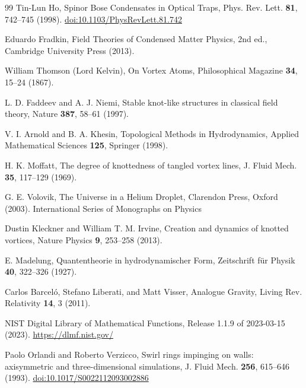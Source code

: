 \documentclass[smallextended]{svjour3}       %
\begin{document}
\begin{thebibliography}{99}
        Tin-Lun Ho,
        Spinor Bose Condensates in Optical Traps,
        Phys. Rev. Lett. \textbf{81}, 742--745 (1998).
        \href{https://doi.org/10.1103/PhysRevLett.81.742}{doi:10.1103/PhysRevLett.81.742}

        Eduardo Fradkin,
        Field Theories of Condensed Matter Physics,
        2nd ed., Cambridge University Press (2013).

        William Thomson (Lord Kelvin),
        On Vortex Atoms,
        Philosophical Magazine \textbf{34}, 15--24 (1867).

        L. D. Faddeev and A. J. Niemi,
        Stable knot-like structures in classical field theory,
        Nature \textbf{387}, 58--61 (1997).

        V. I. Arnold and B. A. Khesin,
        Topological Methods in Hydrodynamics,
        Applied Mathematical Sciences \textbf{125}, Springer (1998).

        H. K. Moffatt,
        The degree of knottedness of tangled vortex lines,
        J. Fluid Mech. \textbf{35}, 117--129 (1969).

        G. E. Volovik,
        The Universe in a Helium Droplet,
        Clarendon Press, Oxford (2003).
        International Series of Monographs on Physics

        Dustin Kleckner and William T. M. Irvine,
        Creation and dynamics of knotted vortices,
        Nature Physics \textbf{9}, 253--258 (2013).

        E. Madelung,
        Quantentheorie in hydrodynamischer Form,
        Zeitschrift f{\"u}r Physik \textbf{40}, 322--326 (1927).

        Carlos Barcel{\'o}, Stefano Liberati, and Matt Visser,
        Analogue Gravity,
        Living Rev. Relativity \textbf{14}, 3 (2011).

        NIST Digital Library of Mathematical Functions,
        Release 1.1.9 of 2023-03-15 (2023).
        \url{https://dlmf.nist.gov/}

        Paolo Orlandi and Roberto Verzicco,
        Swirl rings impinging on walls: axisymmetric and three-dimensional simulations,
        J. Fluid Mech. \textbf{256}, 615--646 (1993).
        \href{https://doi.org/10.1017/S0022112093002886}{doi:10.1017/S0022112093002886}
    \end{thebibliography}
\appendix
\end{document}
